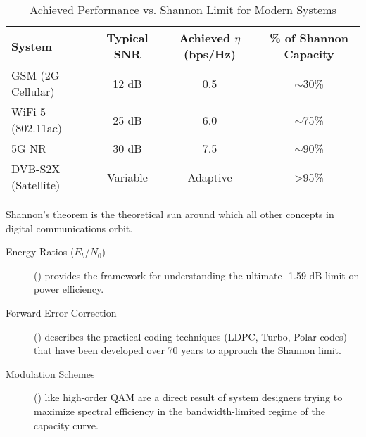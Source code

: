 \begin{table}[H]
    \centering
    \caption{Achieved Performance vs. Shannon Limit for Modern Systems}
    \label{tab:shannon-gap}
    \begin{tabular}{@{}lccc@{}}
        \toprule
        \tableheaderfont System & \tableheaderfont Typical SNR & \tableheaderfont Achieved $\eta$ (bps/Hz) & \tableheaderfont \% of Shannon Capacity \\
        \midrule
        GSM (2G Cellular) & 12 dB & 0.5 & $\sim$30\% \\
        WiFi 5 (802.11ac) & 25 dB & 6.0 & $\sim$75\% \\
        5G NR & 30 dB & 7.5 & $\sim$90\% \\
        DVB-S2X (Satellite) & Variable & Adaptive & >95\% \\
        \bottomrule
    \end{tabular}
\end{table}


\begin{importantbox}[title={Further Reading}]
    Shannon's theorem is the theoretical sun around which all other concepts in digital communications orbit.
    \begin{description}
        \item[Energy Ratios ($E_b/N_0$)] () provides the framework for understanding the ultimate -1.59 dB limit on power efficiency.
        \item[Forward Error Correction] () describes the practical coding techniques (LDPC, Turbo, Polar codes) that have been developed over 70 years to approach the Shannon limit.
        \item[Modulation Schemes] () like high-order QAM are a direct result of system designers trying to maximize spectral efficiency in the bandwidth-limited regime of the capacity curve.
    \end{description}
\end{importantbox}
